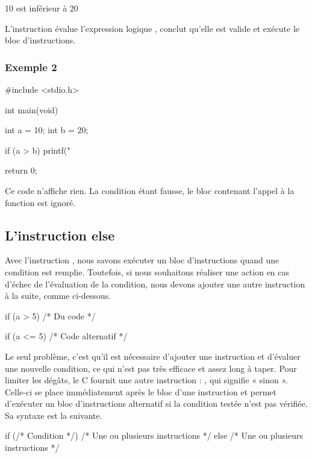 \begin{C}
10 est inférieur à 20
\end{C}

L'instruction  évalue l'expression logique
, conclut qu'elle est valide et exécute le
bloc d'instructions.

\subsubsection{Exemple 2}
\label{exemple-2}

\begin{C}
#include <stdio.h>


int main(void)
{
    int a = 10;
    int b = 20;

    if (a > b)
    {
        printf("%
    }

    return 0;
}
\end{C}

Ce code n'affiche rien. La condition étant fausse, le bloc contenant
l'appel à la fonction  est ignoré.

\subsection{L'instruction else}
\label{linstruction-else}

Avec l'instruction , nous savons exécuter un bloc
d'instructions quand une condition est remplie. Toutefois, si nous
souhaitons réaliser une action en cas d'échec de l'évaluation de la
condition, nous devons ajouter une autre instruction  à la
suite, comme ci-dessous.

\begin{C}
if (a > 5)
{
    /* Du code */
}

if (a <= 5)
{
    /* Code alternatif */
}
\end{C}

Le seul problème, c'est qu'il est nécessaire d'ajouter une instruction
 et d'évaluer une nouvelle condition, ce qui n'est pas très
efficace et assez long à taper. Pour limiter les dégâts, le C fournit
une autre instruction : , qui signifie « sinon ». Celle-ci
se place immédiatement après le bloc d'une instruction  et
permet d'exécuter un bloc d'instructions alternatif si la condition
testée n'est pas vérifiée. Sa syntaxe est la suivante.

\begin{C}
if (/* Condition */)
{
    /* Une ou plusieurs instructions */
}
else
{
    /* Une ou plusieurs instructions */
}
\end{C}

